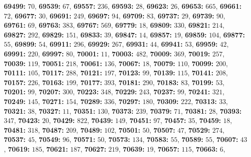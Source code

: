 \textsf{\bfseries 69499:} $70$, \textsf{\bfseries 69539:} $67$, \textsf{\bfseries 69557:} $236$, \textsf{\bfseries 69593:} $28$, \textsf{\bfseries 69623:} $26$, \textsf{\bfseries 69653:} $665$, \textsf{\bfseries 69661:} $72$, \textsf{\bfseries 69677:} $30$, \textsf{\bfseries 69691:} $249$, \textsf{\bfseries 69697:} $94$, \textsf{\bfseries 69709:} $83$, \textsf{\bfseries 69737:} $29$, \textsf{\bfseries 69739:} $90$, \textsf{\bfseries 69761:} $69$, \textsf{\bfseries 69763:} $383$, \textsf{\bfseries 69767:} $569$, \textsf{\bfseries 69779:} $18$, \textsf{\bfseries 69809:} $330$, \textsf{\bfseries 69821:} $214$, \textsf{\bfseries 69827:} $292$, \textsf{\bfseries 69829:} $151$, \textsf{\bfseries 69833:} $39$, \textsf{\bfseries 69847:} $14$, \textsf{\bfseries 69857:} $19$, \textsf{\bfseries 69859:} $104$, \textsf{\bfseries 69877:} $55$, \textsf{\bfseries 69899:} $54$, \textsf{\bfseries 69911:} $296$, \textsf{\bfseries 69929:} $267$, \textsf{\bfseries 69931:} $44$, \textsf{\bfseries 69941:} $53$, \textsf{\bfseries 69959:} $42$, \textsf{\bfseries 69991:} $220$, \textsf{\bfseries 69997:} $80$, \textsf{\bfseries 70001:} $11$, \textsf{\bfseries 70003:} $482$, \textsf{\bfseries 70009:} $369$, \textsf{\bfseries 70019:} $257$, \textsf{\bfseries 70039:} $119$, \textsf{\bfseries 70051:} $218$, \textsf{\bfseries 70061:} $136$, \textsf{\bfseries 70067:} $18$, \textsf{\bfseries 70079:} $110$, \textsf{\bfseries 70099:} $200$, \textsf{\bfseries 70111:} $105$, \textsf{\bfseries 70117:} $288$, \textsf{\bfseries 70121:} $197$, \textsf{\bfseries 70123:} $99$, \textsf{\bfseries 70139:} $115$, \textsf{\bfseries 70141:} $208$, \textsf{\bfseries 70157:} $226$, \textsf{\bfseries 70163:} $199$, \textsf{\bfseries 70177:} $393$, \textsf{\bfseries 70181:} $290$, \textsf{\bfseries 70183:} $83$, \textsf{\bfseries 70199:} $53$, \textsf{\bfseries 70201:} $99$, \textsf{\bfseries 70207:} $300$, \textsf{\bfseries 70223:} $348$, \textsf{\bfseries 70229:} $243$, \textsf{\bfseries 70237:} $99$, \textsf{\bfseries 70241:} $321$, \textsf{\bfseries 70249:} $145$, \textsf{\bfseries 70271:} $154$, \textsf{\bfseries 70289:} $336$, \textsf{\bfseries 70297:} $180$, \textsf{\bfseries 70309:} $222$, \textsf{\bfseries 70313:} $33$, \textsf{\bfseries 70321:} $38$, \textsf{\bfseries 70327:} $11$, \textsf{\bfseries 70351:} $130$, \textsf{\bfseries 70373:} $239$, \textsf{\bfseries 70379:} $71$, \textsf{\bfseries 70381:} $28$, \textsf{\bfseries 70393:} $347$, \textsf{\bfseries 70423:} $20$, \textsf{\bfseries 70429:} $822$, \textsf{\bfseries 70439:} $149$, \textsf{\bfseries 70451:} $97$, \textsf{\bfseries 70457:} $35$, \textsf{\bfseries 70459:} $18$, \textsf{\bfseries 70481:} $318$, \textsf{\bfseries 70487:} $209$, \textsf{\bfseries 70489:} $102$, \textsf{\bfseries 70501:} $50$, \textsf{\bfseries 70507:} $47$, \textsf{\bfseries 70529:} $274$, \textsf{\bfseries 70537:} $45$, \textsf{\bfseries 70549:} $96$, \textsf{\bfseries 70571:} $50$, \textsf{\bfseries 70573:} $134$, \textsf{\bfseries 70583:} $55$, \textsf{\bfseries 70589:} $55$, \textsf{\bfseries 70607:} $43$, \textsf{\bfseries 70619:} $185$, \textsf{\bfseries 70621:} $187$, \textsf{\bfseries 70627:} $219$, \textsf{\bfseries 70639:} $19$, \textsf{\bfseries 70657:} $115$, \textsf{\bfseries 70663:} $6$, 
